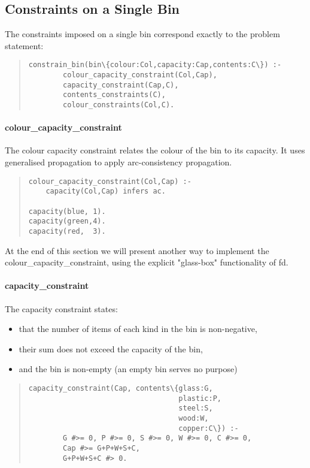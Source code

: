 \subsection{Constraints on a Single Bin}

The constraints imposed on a single bin correspond exactly to the
problem statement:
\begin{quote}
\begin{verbatim}
constrain_bin(bin\{colour:Col,capacity:Cap,contents:C\}) :-
        colour_capacity_constraint(Col,Cap),
        capacity_constraint(Cap,C),
        contents_constraints(C),
        colour_constraints(Col,C).
\end{verbatim}
\end{quote}

\paragraph{colour\_capacity\_constraint} 
The colour capacity constraint relates the colour of the bin to its
capacity.  It uses generalised propagation to apply
arc-consistency propagation.
\begin{quote}
\begin{verbatim}
colour_capacity_constraint(Col,Cap) :-
	capacity(Col,Cap) infers ac.

capacity(blue, 1). 
capacity(green,4).
capacity(red,  3).
\end{verbatim}
\end{quote}
At the end of this section we will present another way to implement the
colour\_capacity\_constraint, using the explicit "glass-box"
functionality of fd. 

\paragraph{capacity\_constraint}
The capacity constraint states:
\begin{itemize}
\item that the number of items of each
kind in the bin is non-negative, 
\item
their sum does not exceed the capacity of the bin,   
\item and the bin is non-empty (an empty bin serves no purpose)
\end{itemize}

\begin{quote}
\begin{verbatim}
capacity_constraint(Cap, contents\{glass:G,
                                   plastic:P,
                                   steel:S, 
                                   wood:W,
                                   copper:C\}) :-
        G #>= 0, P #>= 0, S #>= 0, W #>= 0, C #>= 0,
        Cap #>= G+P+W+S+C,
        G+P+W+S+C #> 0.
\end{verbatim}
\end{quote}

